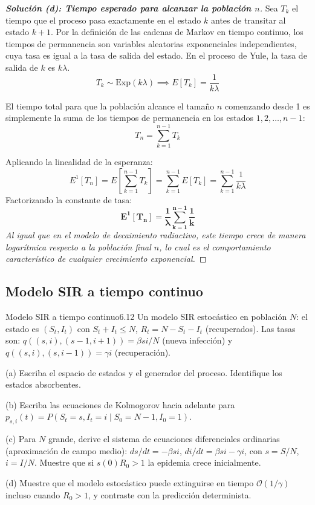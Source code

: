 \documentclass[10pt,a4paper]{article}
\begin{document}
\vspace{5mm}

\begin{proof}[\textbf{Solución (d): Tiempo esperado para alcanzar la población $n$}]
    Sea $T_k$ el tiempo que el proceso pasa exactamente en el estado $k$ antes de transitar al estado $k+1$.
    Por la definición de las cadenas de Markov en tiempo continuo, los tiempos de permanencia son variables aleatorias exponenciales independientes, cuya tasa es igual a la tasa de salida del estado. En el proceso de Yule, la tasa de salida de $k$ es $k\lambda$.
    \[ T_k \sim \text{Exp}(k\lambda) \implies E[T_k] = \frac{1}{k\lambda} \]
    
    El tiempo total para que la población alcance el tamaño $n$ comenzando desde 1 es simplemente la suma de los tiempos de permanencia en los estados $1, 2, \dots, n-1$:
    \[ T_n = \sum_{k=1}^{n-1} T_k \]
    
    Aplicando la linealidad de la esperanza:
    \[ E^1[T_n] = E\left[ \sum_{k=1}^{n-1} T_k \right] = \sum_{k=1}^{n-1} E[T_k] = \sum_{k=1}^{n-1} \frac{1}{k\lambda} \]
    Factorizando la constante de tasa:
    \[ \mathbf{E^1[T_n] = \frac{1}{\lambda} \sum_{k=1}^{n-1} \frac{1}{k}} \]
    \textit{Al igual que en el modelo de decaimiento radiactivo, este tiempo crece de manera logarítmica respecto a la población final $n$, lo cual es el comportamiento característico de cualquier crecimiento exponencial.}
\end{proof}


\newpage

\subsection{Modelo SIR a tiempo continuo}


\begin{ejercicio}{Modelo SIR a tiempo continuo}{6.12}
    Un modelo SIR estocástico en población $N$: el estado es $(S_t, I_t)$ con $S_t + I_t \le N$, $R_t = N - S_t - I_t$ (recuperados). Las tasas son: $q((s, i), (s - 1, i + 1)) = \beta si/N$ (nueva infección) y $q((s, i), (s, i - 1)) = \gamma i$ (recuperación).
    
    (a) Escriba el espacio de estados y el generador del proceso. Identifique los estados absorbentes.
    
    (b) Escriba las ecuaciones de Kolmogorov hacia adelante para $p_{s,i}(t) = P(S_t = s, I_t = i \mid S_0 = N - 1, I_0 = 1)$.
    
    (c) Para $N$ grande, derive el sistema de ecuaciones diferenciales ordinarias (aproximación de campo medio): $ds/dt = -\beta si$, $di/dt = \beta si - \gamma i$, con $s = S/N$, $i = I/N$. Muestre que si $s(0)R_0 > 1$ la epidemia crece inicialmente.
    
    (d) Muestre que el modelo estocástico puede extinguirse en tiempo $\mathcal{O}(1/\gamma)$ incluso cuando $R_0 > 1$, y contraste con la predicción determinista.
\end{ejercicio}
\end{document}
